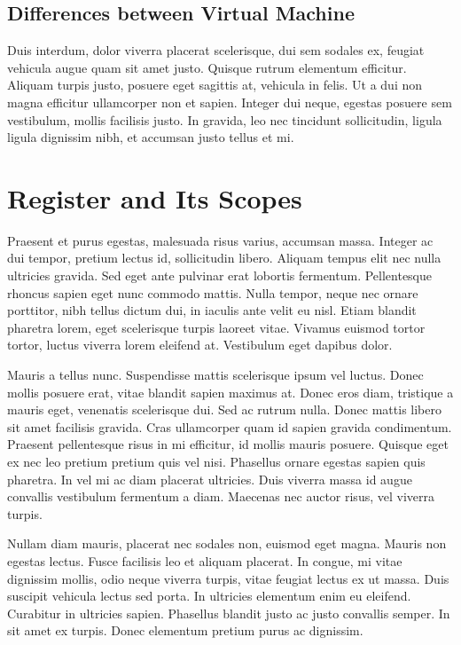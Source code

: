 \subsection{Differences between Virtual Machine}
Duis interdum, dolor viverra placerat scelerisque, dui sem sodales ex, feugiat vehicula augue quam sit amet justo. Quisque rutrum elementum efficitur. Aliquam turpis justo, posuere eget sagittis at, vehicula in felis. Ut a dui non magna efficitur ullamcorper non et sapien. Integer dui neque, egestas posuere sem vestibulum, mollis facilisis justo. In gravida, leo nec tincidunt sollicitudin, ligula ligula dignissim nibh, et accumsan justo tellus et mi.


\section{Register and Its Scopes}
Praesent et purus egestas, malesuada risus varius, accumsan massa. Integer ac dui tempor, pretium lectus id, sollicitudin libero. Aliquam tempus elit nec nulla ultricies gravida. Sed eget ante pulvinar erat lobortis fermentum. Pellentesque rhoncus sapien eget nunc commodo mattis. Nulla tempor, neque nec ornare porttitor, nibh tellus dictum dui, in iaculis ante velit eu nisl. Etiam blandit pharetra lorem, eget scelerisque turpis laoreet vitae. Vivamus euismod tortor tortor, luctus viverra lorem eleifend at. Vestibulum eget dapibus dolor.

Mauris a tellus nunc. Suspendisse mattis scelerisque ipsum vel luctus. Donec mollis posuere erat, vitae blandit sapien maximus at. Donec eros diam, tristique a mauris eget, venenatis scelerisque dui. Sed ac rutrum nulla. Donec mattis libero sit amet facilisis gravida. Cras ullamcorper quam id sapien gravida condimentum. Praesent pellentesque risus in mi efficitur, id mollis mauris posuere. Quisque eget ex nec leo pretium pretium quis vel nisi. Phasellus ornare egestas sapien quis pharetra. In vel mi ac diam placerat ultricies. Duis viverra massa id augue convallis vestibulum fermentum a diam. Maecenas nec auctor risus, vel viverra turpis.

Nullam diam mauris, placerat nec sodales non, euismod eget magna. Mauris non egestas lectus. Fusce facilisis leo et aliquam placerat. In congue, mi vitae dignissim mollis, odio neque viverra turpis, vitae feugiat lectus ex ut massa. Duis suscipit vehicula lectus sed porta. In ultricies elementum enim eu eleifend. Curabitur in ultricies sapien. Phasellus blandit justo ac justo convallis semper. In sit amet ex turpis. Donec elementum pretium purus ac dignissim.

